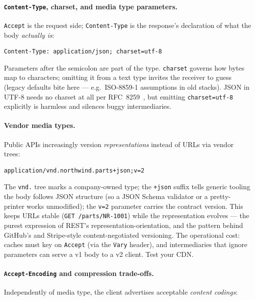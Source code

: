 \paragraph{\texttt{Content-Type}, charset, and media type parameters.}
\texttt{Accept} is the request side; \texttt{Content-Type} is the response's
declaration of what the body \emph{actually is}:

\begin{verbatim}
Content-Type: application/json; charset=utf-8
\end{verbatim}

Parameters after the semicolon are part of the type. \texttt{charset} governs how
bytes map to characters; omitting it from a text type invites the receiver to guess
(legacy defaults bite here --- e.g.\ ISO-8859-1 assumptions in old stacks). JSON in
UTF-8 needs no charset at all per RFC~8259~\cite{rfc8259}, but emitting
\texttt{charset=utf-8} explicitly is harmless and silences buggy intermediaries.

\paragraph{Vendor media types.}
Public APIs increasingly version \emph{representations} instead of URLs via vendor
trees:

\begin{verbatim}
application/vnd.northwind.parts+json;v=2
\end{verbatim}

The \texttt{vnd.} tree marks a company-owned type; the \texttt{+json} suffix tells
generic tooling the body follows JSON structure (so a JSON Schema validator or a
pretty-printer works unmodified); the \texttt{v=2} parameter carries the contract
version. This keeps URLs stable (\texttt{GET /parts/NR-1001}) while the
representation evolves --- the purest expression of REST's
representation-orientation, and the pattern behind GitHub's and Stripe-style
content-negotiated versioning. The operational cost: caches must key on
\texttt{Accept} (via the \texttt{Vary} header), and intermediaries that ignore
parameters can serve a v1 body to a v2 client. Test your CDN.

\paragraph{\texttt{Accept-Encoding} and compression trade-offs.}
Independently of media type, the client advertises acceptable \emph{content
codings}:

